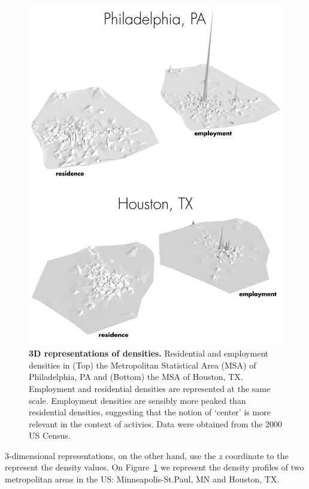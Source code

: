 \begin{figure}
    \centering
    \includegraphics[width=\textwidth]{gfx/chapter-monocentric/panel_3d.png}
    \caption{{\bf 3D representations of densities.} Residential and
        employment densities in (Top) the Metropolitan Statistical Area (MSA) of
        Philadelphia, PA and (Bottom) the MSA of Houston, TX. Employment and
        residential densities are represented at the same scale.  Employment
        densities are sensibly more peaked than residential densities,
        suggesting that the notion of `center' is more relevant in the context of
        activies. Data were obtained from the 2000 US Census.  \label{fig:density_3d}}
\end{figure}


3-dimensional representations, on the other hand, use the $z$ coordinate to the
represent the density values. On Figure~\ref{fig:density_3d} we represent the
density profiles of two metropolitan areas in the US: Minneapolis-St.Paul, MN
and Houston, TX. 

